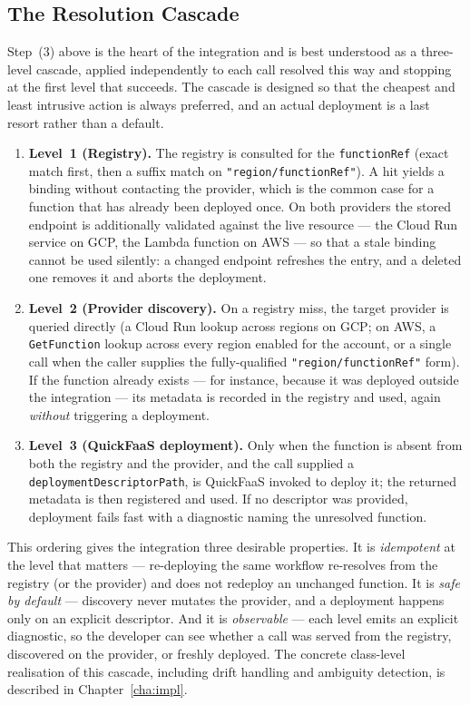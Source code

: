 \subsection{The Resolution Cascade}
\label{sec:resolution-cascade}

Step~(3) above is the heart of the integration and is best understood as a three-level cascade,
applied independently to each call resolved this way and stopping at the first level that succeeds. The
cascade is designed so that the cheapest and least intrusive action is always preferred, and an
actual deployment is a last resort rather than a default.

\begin{enumerate}
  \item \textbf{Level~1 (Registry).} The registry is consulted for the \texttt{functionRef}
  (exact match first, then a suffix match on \texttt{"region/functionRef"}). A hit yields a binding
  without contacting the provider, which is the common case for a function that has already been
  deployed once. On both providers the stored endpoint is additionally validated against the live
  resource --- the Cloud Run service on GCP, the Lambda function on AWS --- so that a stale binding
  cannot be used silently: a changed endpoint refreshes the entry, and a deleted one removes it and
  aborts the deployment.
  \item \textbf{Level~2 (Provider discovery).} On a registry miss, the target provider is queried
  directly (a Cloud Run lookup across regions on GCP; on AWS, a \texttt{GetFunction} lookup across
  every region enabled for the account, or a single call when the caller supplies the
  fully-qualified \texttt{"region/functionRef"} form). If the
  function already exists --- for instance, because it was deployed outside the integration --- its
  metadata is recorded in the registry and used, again \emph{without} triggering a deployment.
  \item \textbf{Level~3 (QuickFaaS deployment).} Only when the function is absent from both the
  registry and the provider, and the call supplied a \texttt{deploymentDescriptorPath}, is QuickFaaS
  invoked to deploy it; the returned metadata is then registered and used. If no descriptor was
  provided, deployment fails fast with a diagnostic naming the unresolved function.
\end{enumerate}

This ordering gives the integration three desirable properties. It is \emph{idempotent} at the
level that matters --- re-deploying the same workflow re-resolves from the registry (or the
provider) and does not redeploy an unchanged function. It is \emph{safe by default} --- discovery
never mutates the provider, and a deployment happens only on an explicit descriptor. And it is
\emph{observable} --- each level emits an explicit diagnostic, so the developer can see whether a
call was served from the registry, discovered on the provider, or freshly deployed. The concrete
class-level realisation of this cascade, including drift handling and ambiguity detection, is
described in Chapter~\ref{cha:impl}.

